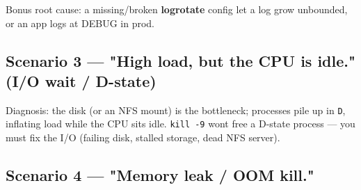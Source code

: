\documentclass[11pt]{article}
\newenvironment{Shaded}{\begin{snugshade}}{\end{snugshade}}
\newcommand{\AttributeTok}[1]{\textcolor[rgb]{0.16,0.50,0.73}{#1}}
\newcommand{\CommentTok}[1]{\textcolor[rgb]{0.48,0.49,0.49}{#1}}
\newcommand{\ExtensionTok}[1]{\textcolor[rgb]{0.00,0.60,1.00}{\textbf{#1}}}
\newcommand{\FunctionTok}[1]{\textcolor[rgb]{0.56,0.27,0.68}{#1}}
\newcommand{\KeywordTok}[1]{\textcolor[rgb]{0.81,0.81,0.76}{\textbf{#1}}}
\newcommand{\NormalTok}[1]{\textcolor[rgb]{0.81,0.81,0.76}{#1}}
\newcommand{\StringTok}[1]{\textcolor[rgb]{0.96,0.31,0.31}{#1}}
\begin{document}
Bonus root cause: a missing/broken \textbf{logrotate} config let a log grow unbounded, or an app logs at DEBUG in prod.

\subsection{Scenario 3 --- "High load, but the CPU is idle." (I/O wait / D-state)}\label{scenario-3--high-load-but-the-cpu-is-idle-io-wait--d-state}


\begin{Shaded}
\end{Shaded}

Diagnosis: the disk (or an NFS mount) is the bottleneck; processes pile up in \texttt{D}, inflating load while the CPU sits idle. \texttt{kill\ -9} won\textquotesingle t free a D-state process --- you must fix the I/O (failing disk, stalled storage, dead NFS server).

\subsection{Scenario 4 --- "Memory leak / OOM kill."}\label{scenario-4--memory-leak--oom-kill}
\end{document}
